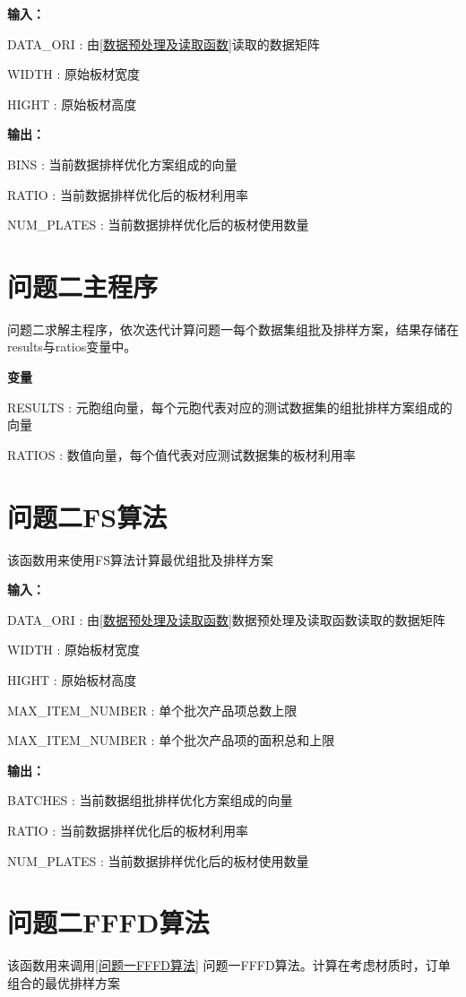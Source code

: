 \documentclass[bwprint]{gmcmthesis}
\begin{document}
\textbf{输入：} 

DATA\_ORI : 由\ref{数据预处理及读取函数}读取的数据矩阵

WIDTH : 原始板材宽度

HIGHT : 原始板材高度

\textbf{输出：} 

BINS : 当前数据排样优化方案组成的向量

RATIO : 当前数据排样优化后的板材利用率

NUM\_PLATES : 当前数据排样优化后的板材使用数量



\newpage
\section{问题二主程序}
问题二求解主程序，依次迭代计算问题一每个数据集组批及排样方案，结果存储在results与ratios变量中。

\textbf{变量}

RESULTS : 元胞组向量，每个元胞代表对应的测试数据集的组批排样方案组成的向量

RATIOS : 数值向量，每个值代表对应测试数据集的板材利用率


\newpage
\section{问题二FS算法}
该函数用来使用FS算法计算最优组批及排样方案

\textbf{输入：} 

DATA\_ORI : 由\ref{数据预处理及读取函数}数据预处理及读取函数读取的数据矩阵

WIDTH : 原始板材宽度

HIGHT : 原始板材高度

MAX\_ITEM\_NUMBER : 单个批次产品项总数上限

MAX\_ITEM\_NUMBER : 单个批次产品项的面积总和上限

\textbf{输出：} 

BATCHES : 当前数据组批排样优化方案组成的向量

RATIO : 当前数据排样优化后的板材利用率

NUM\_PLATES : 当前数据排样优化后的板材使用数量


\newpage
\section{问题二FFFD算法}
该函数用来调用\ref{问题一FFFD算法} 问题一FFFD算法。计算在考虑材质时，订单组合的最优排样方案
\end{document}

